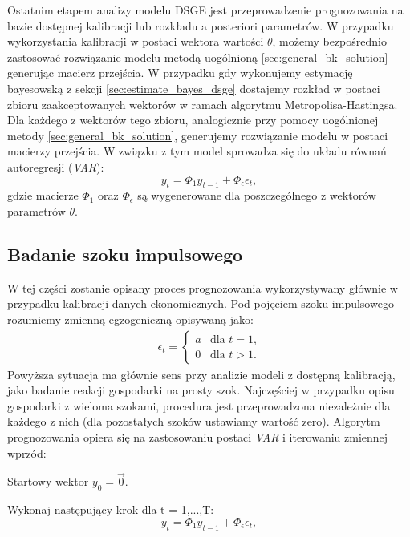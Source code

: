 Ostatnim etapem analizy modelu DSGE jest przeprowadzenie prognozowania na bazie dostępnej kalibracji lub rozkładu a posteriori parametrów. W przypadku wykorzystania kalibracji w postaci wektora wartości $\theta$, możemy bezpośrednio zastosować rozwiązanie modelu metodą uogólnioną \ref{sec:general_bk_solution} generując macierz przejścia. W przypadku gdy wykonujemy estymację bayesowską z sekcji \ref{sec:estimate_bayes_dsge} dostajemy rozkład w postaci zbioru zaakceptowanych wektorów w ramach algorytmu Metropolisa-Hastingsa. Dla każdego z wektorów tego zbioru, analogicznie przy pomocy uogólnionej metody \ref{sec:general_bk_solution}, generujemy rozwiązanie modelu w postaci macierzy przejścia. W związku z tym model sprowadza się do układu równań autoregresji (\emph{VAR}):
\begin{equation}
    \label{eqn:varModelProg}
    y_t = \Phi_1 y_{t-1}+\Phi_{\epsilon} \epsilon_t,
\end{equation}
gdzie macierze $\Phi_1$ oraz $\Phi_{\epsilon}$ są wygenerowane dla poszczególnego z wektorów parametrów $\theta$.

\subsection{Badanie szoku impulsowego}

W tej części zostanie opisany proces prognozowania wykorzystywany głównie w przypadku kalibracji danych ekonomicznych. Pod pojęciem szoku impulsowego rozumiemy zmienną egzogeniczną opisywaną jako: 
\begin{gather}
        \epsilon_{t} =
        \begin{cases}
            a & \text{dla $t = 1$,} \\
            0 & \text{dla $t > 1$.}
        \end{cases}
    \end{gather}
Powyższa sytuacja ma głównie sens przy analizie modeli z dostępną kalibracją, jako badanie reakcji gospodarki na prosty szok. Najczęściej w przypadku opisu gospodarki z wieloma szokami, procedura jest przeprowadzona niezależnie dla każdego z nich (dla pozostałych szoków ustawiamy wartość zero). Algorytm prognozowania opiera się na zastosowaniu postaci \emph{VAR} i iterowaniu zmiennej wprzód:

\begin{algDefinition}

Startowy wektor $y_0 = \vec{0}$.

Wykonaj następujący krok dla t = 1,...,T:
\begin{equation}
    y_t = \Phi_1 y_{t-1} +\Phi_{\epsilon} \epsilon_t,
\end{equation}

\end{algDefinition}

